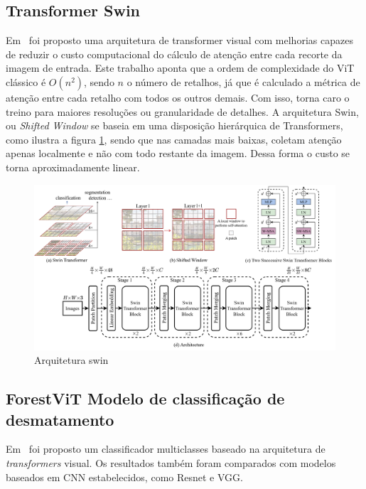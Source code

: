 \subsection{Transformer Swin}\label{sec:Cap2_Swin}

Em~\cite{liu2022swin} foi proposto uma arquitetura de transformer visual com melhorias capazes de reduzir o custo computacional do cálculo de atenção entre cada recorte da imagem de entrada. Este trabalho aponta que a ordem de complexidade do ViT clássico é $O(n^2)$, sendo $n$ o número de retalhos, já que é calculado a métrica de atenção entre cada retalho com todos os outros demais. Com isso, torna caro o treino para maiores resoluções ou granularidade de detalhes. A arquitetura Swin, ou \textit{Shifted Window} se baseia em uma disposição hierárquica de Transformers, como ilustra a figura \ref{fig:SWIN-arquitetura}, sendo que nas camadas mais baixas, coletam atenção apenas localmente e não com todo restante da imagem. Dessa forma o custo se torna aproximadamente linear. 


\begin{figure}[!ht]
    \centering
    \includegraphics[width=\columnwidth]{Imagens/arquitetura swin.png}
    \caption{Arquitetura swin ~\cite{liu2022swin}}
    \label{fig:SWIN-arquitetura}
\end{figure}



\subsection{ForestViT Modelo de classificação de desmatamento}\label{sec:Cap2_ForestViT}

Em~\cite{9701667} foi proposto um classificador multiclasses baseado na arquitetura de \textit{transformers} visual. Os resultados também foram comparados com modelos baseados em CNN estabelecidos, como Resnet e VGG. 



